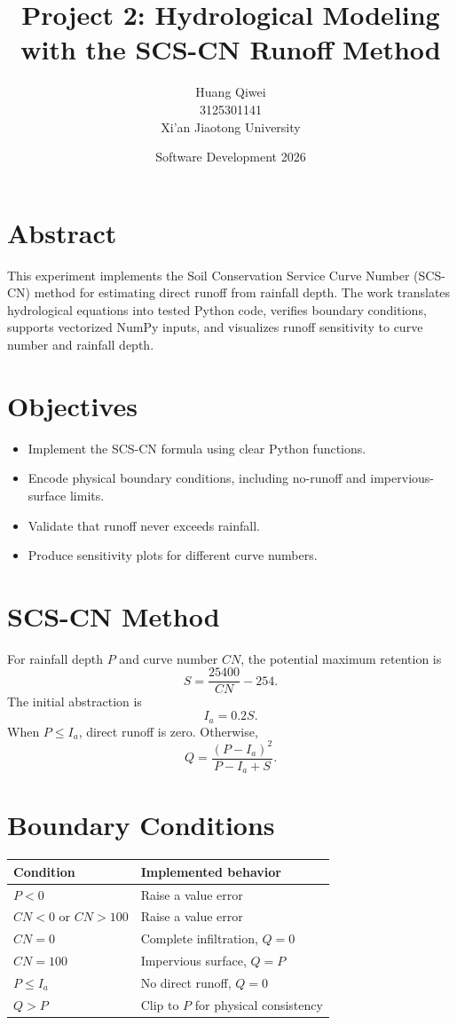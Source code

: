 \documentclass[11pt]{article}
\title{Project 2: Hydrological Modeling with the SCS-CN Runoff Method}
\author{Huang Qiwei \\ 3125301141 \\ Xi'an Jiaotong University}
\date{Software Development 2026}
\begin{document}
\maketitle

\section*{Abstract}
This experiment implements the Soil Conservation Service Curve Number (SCS-CN) method for estimating direct runoff from rainfall depth. The work translates hydrological equations into tested Python code, verifies boundary conditions, supports vectorized NumPy inputs, and visualizes runoff sensitivity to curve number and rainfall depth.

\section*{Objectives}
\begin{itemize}
  \item Implement the SCS-CN formula using clear Python functions.
  \item Encode physical boundary conditions, including no-runoff and impervious-surface limits.
  \item Validate that runoff never exceeds rainfall.
  \item Produce sensitivity plots for different curve numbers.
\end{itemize}

\section*{SCS-CN Method}
For rainfall depth $P$ and curve number $CN$, the potential maximum retention is
\[
S = \frac{25400}{CN} - 254.
\]
The initial abstraction is
\[
I_a = 0.2S.
\]
When $P \le I_a$, direct runoff is zero. Otherwise,
\[
Q = \frac{(P-I_a)^2}{P-I_a+S}.
\]

\section*{Boundary Conditions}
\begin{longtable}{ll}
\toprule
Condition & Implemented behavior \\
\midrule
$P < 0$ & Raise a value error \\
$CN < 0$ or $CN > 100$ & Raise a value error \\
$CN = 0$ & Complete infiltration, $Q=0$ \\
$CN = 100$ & Impervious surface, $Q=P$ \\
$P \le I_a$ & No direct runoff, $Q=0$ \\
$Q > P$ & Clip to $P$ for physical consistency \\
\bottomrule
\end{longtable}
\end{document}
